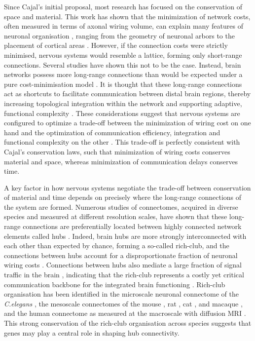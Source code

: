 Since Cajal's initial proposal, most research has focused on the conservation of space and material. This work has shown that the minimization of network costs, often measured in terms of axonal wiring volume, can explain many features of neuronal organisation \citep{Cherniak1994,Chklovskii2002,Klyachko2003,Rivera-Alba2011,Wen2005}, ranging from the geometry of neuronal arbors \citep{Cherniak1999} to the placement of cortical areas \citep{Cherniak2004}. However, if the connection costs were strictly minimised, nervous systems would resemble a lattice, forming only short-range connections. Several studies have shown this not to be the case. Instead, brain networks possess more long-range connections than would be expected under a pure cost-minimisation model \citep{Bassett2006,Bullmore2012,Kaiser2006}. It is thought that these long-range connections act as shortcuts to facilitate communication between distal brain regions, thereby increasing topological integration within the network \citep{Bullmore2012,Buzsaki2004a,VandenHeuvel2012} and supporting adaptive, functional complexity \citep{Betzel2018}. These considerations suggest that nervous systems are configured to optimize a trade-off between the minimization of wiring cost on one hand and the optimization of communication efficiency, integration and functional complexity on the other \citep{Bullmore2012}. This trade-off is perfectly consistent with Cajal's conservation laws, such that minimization of wiring costs conserves material and space, whereas minimization of communication delays conserves time.

A key factor in how nervous systems negotiate the trade-off between conservation of material and time depends on precisely where the long-range connections of the system are formed. Numerous studies of connectomes, acquired in diverse species and measured at different resolution scales, have shown that these long-range connections are preferentially located between highly connected network elements called hubs \citep{Harriger2012,Towlson2013,VandenHeuvel2011,VandenHeuvel2013b}. Indeed, brain hubs are more strongly interconnected with each other than expected by chance, forming a so-called rich-club, and the connections between hubs account for a disproportionate fraction of neuronal wiring costs \citep{Arnatkeviciute2018,Fulcher2016,Harriger2012,Towlson2013,VandenHeuvel2011}. Connections between hubs also mediate a large fraction of signal traffic in the brain \citep{Misic2016,VandenHeuvel2011}, indicating that the rich-club represents a costly yet critical communication backbone for the integrated brain functioning \citep{Gratton2012,Markov2013a,VandenHeuvel2018,VandenHeuvel2013a}. Rich-club organisation has been identified in the microscale neuronal connectome of the \textit{C.elegans} \citep{Towlson2013}, the mesoscale connectomes of the mouse \citep{Fulcher2016}, rat \citep{Liang2017}, cat \citep{DeReus2013b}, and macaque \citep{Harriger2012}, and the human connectome as measured at the macroscale with diffusion MRI \citep{VandenHeuvel2011}. This strong conservation of the rich-club organisation across species suggests that genes may play a central role in shaping hub connectivity.


